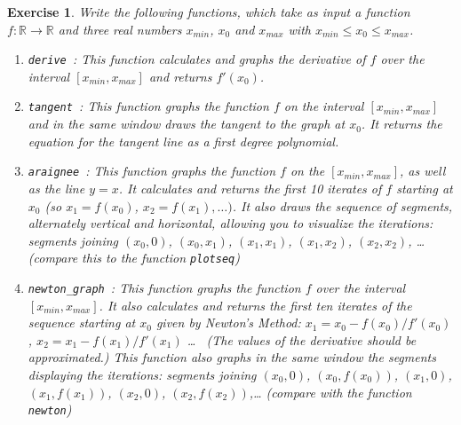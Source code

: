 \documentclass{article}
\newcommand{\R}{{\mathbb{R}}}
\newtheorem{exo}{Exercise}[section]
\begin{document}
\begin{exo}{\rm
Write the following functions, which take as input a function $f:\R
\to \R$ and three real numbers $x_{min}$, $x_0$ and $x_{max}$ with
$x_{min}\leq x_0 \leq x_{max}$. 
\begin{enumerate}
\item \texttt{derive}~: 
This function calculates and graphs the derivative of $f$ over the
interval $[x_{min},x_{max}]$ and returns $f'(x_0)$.
\item \texttt{tangent}~: 
This function graphs the function $f$ on the interval
$[x_{min},x_{max}]$ and in the same window draws the tangent to the
graph at $x_0$.  It returns the equation for the tangent line as a
first degree polynomial.
\item \texttt{araignee}~:
This function graphs the function $f$ on the $[x_{min},x_{max}]$, as
well as the line $y=x$.  It calculates and returns the first 10
iterates of $f$ starting at $x_0$ (so $x_1 = f(x_0)$, $x_2 =
f(x_1),\dots)$.  It also draws the sequence of segments, alternately
vertical and horizontal, allowing you to visualize the iterations:
segments joining $(x_0,0)$, $(x_0,x_1)$, $(x_1,x_1)$,
$(x_1,x_2)$, $(x_2,x_2)$, \ldots
(compare this to the function \texttt{plotseq})
\item \texttt{newton\_graph}~:
This function graphs the function $f$ over the interval $[x_{min},x_{max}]$.
It also calculates and returns the first ten iterates of the sequence
starting at $x_0$ given by Newton's Method: $x_1=x_0 -f(x_0)/f'(x_0)$,
$x_2=x_1 - f(x_1)/f'(x_1)$ \ldots~  (The values of the derivative
should be approximated.)  This function also graphs in the same window
the segments displaying the iterations: segments joining
$(x_0,0)$, $(x_0,f(x_0))$, $(x_1,0)$,
$(x_1,f(x_1))$, $(x_2,0)$, $(x_2,f(x_2))$,\ldots
(compare with the function \texttt{newton})
\end{enumerate}
}\end{exo}
\end{document}
